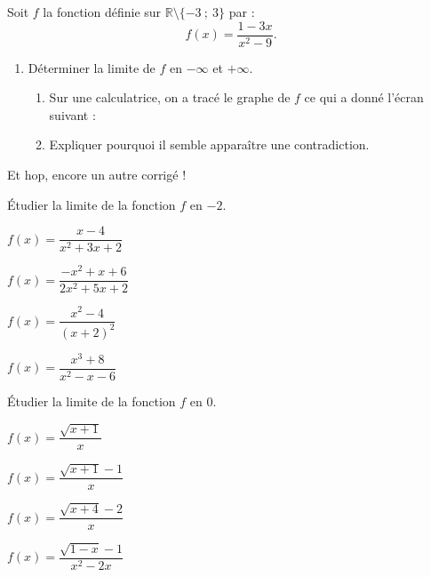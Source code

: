 
\begin{exercice}
Soit $f$ la fonction définie sur $\mathbb{R}\setminus\{-3~;~3\}$ par :
\[f(x)=\dfrac{1-3x}{x^2-9}.\]
\begin{enumerate}
\item Déterminer la limite de $f$ en $-\infty$ et $+\infty$.
\begin{enumerate}
\item Sur une calculatrice, on a tracé le graphe de $f$ ce qui a donné l'écran suivant :
\item Expliquer pourquoi il semble apparaître une contradiction.
\end{enumerate}
\end{enumerate}
\begin{corrige}
  Et hop, encore un autre corrigé !
\end{corrige}
\end{exercice}


\begin{exercice}
 Étudier la limite de la fonction $f$ en  $-2$.
   \begin{colenumerate}{2}
    \item $f(x)=\dfrac{x-4}{x^2+3x+2}$
    \item $f(x)=\dfrac{-x^2+x+6}{2x^2+5x+2}$
    \item $f(x)=\dfrac{x^2-4}{\left(x+2\right)^2}$
    \item $f(x)=\dfrac{x^3+8}{x^2-x-6}$
    \end{colenumerate}
\end{exercice}


\begin{exercice}
 Étudier la limite de la fonction $f$ en  $0$.
   \begin{colenumerate}{2}
    \item $f(x)=\dfrac{\sqrt{x+1}}{x}$
    \item $f(x)=\dfrac{\sqrt{x+1}-1}{x}$
    \item $f(x)=\dfrac{\sqrt{x+4}-2}{x}$
    \item $f(x)=\dfrac{\sqrt{1-x}-1}{x^2-2x}$
    \end{colenumerate}
\end{exercice}






